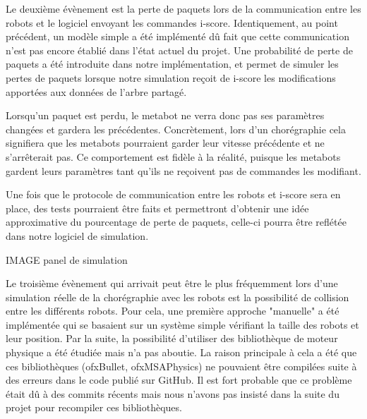 Le deuxième évènement est la perte de paquets lors de la communication entre les robots et le logiciel envoyant les commandes i-score. Identiquement, au point précédent, un modèle simple a été implémenté dû fait que cette communication n'est pas encore établié dans l'état actuel du projet. Une probabilité de perte de paquets a été introduite dans notre implémentation, et permet de simuler les pertes de paquets lorsque notre simulation reçoit de i-score les modifications apportées aux données de l'arbre partagé. 

Lorsqu'un paquet est perdu, le metabot ne verra donc pas ses paramètres changées et gardera les précédentes. Concrètement, lors d'un chorégraphie cela signifiera que les metabots pourraient garder leur vitesse précédente et ne s'arrêterait pas. Ce comportement est fidèle à la réalité, puisque les metabots gardent leurs paramètres tant qu'ils ne reçoivent pas de commandes les modifiant. 

Une fois que le protocole de communication entre les robots et i-score sera en place, des tests pourraient être faits et permettront d'obtenir une idée approximative du pourcentage de perte de paquets, celle-ci pourra être reflétée dans notre logiciel de simulation.

IMAGE panel de simulation

Le troisième évènement qui arrivait peut être le plus fréquemment lors d'une simulation réelle de la chorégraphie avec les robots est la possibilité de collision entre les différents robots. Pour cela, une première approche "manuelle" a été implémentée qui se basaient sur un système simple vérifiant la taille des robots et leur position. Par la suite, la possibilité d'utiliser des bibliothèque de moteur physique a été étudiée mais n'a pas aboutie. La raison principale à cela a été que ces bibliothèques (ofxBullet, ofxMSAPhysics) ne pouvaient être compilées suite à des erreurs dans le code publié sur GitHub. Il est fort probable que ce problème était dû à des commits récents mais nous n'avons pas insisté dans la suite du projet pour recompiler ces bibliothèques. 

